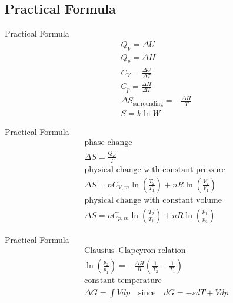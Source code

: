 \documentclass[12pt,compress]{beamer}
\begin{document}
\subsection{Practical Formula}
\begin{frame}{Practical Formula}
    \begin{align}
         & Q_V = \Delta U                                      \\
         & Q_p = \Delta H                                      \\
         & C_V = \frac{\Delta U}{\Delta T}                     \\
         & C_p = \frac{\Delta H}{\Delta T}                     \\
         & \Delta S_{\text{surrounding}} = -\frac{\Delta H}{T} \\
         & S=k\ln W
    \end{align}
\end{frame}
\begin{frame}{Practical Formula}
    \begin{align}
         & \text{phase change } \nonumber                                                         \\
         & \Delta S = \frac{Q_R}{T}                                                               \\
         & \text{physical change with constant pressure } \nonumber                               \\
         & \Delta S = nC_{V,m}\ln\left(\frac{T_2}{T_1}\right) + nR\ln\left(\frac{V_2}{V_1}\right) \\
         & \text{physical change with constant volume } \nonumber                                 \\
         & \Delta S = nC_{p,m}\ln\left(\frac{T_2}{T_1}\right) + nR\ln\left(\frac{p_1}{p_2}\right)
    \end{align}
\end{frame}
\begin{frame}{Practical Formula}
    \begin{align}
         & \text{Clausius–Clapeyron relation} \nonumber                                                  \\
         & \ln\left(\frac{p_2}{p_1}\right) = -\frac{\Delta H}{R}\left(\frac{1}{T_2}-\frac{1}{T_1}\right) \\
         & \text{constant temperature} \nonumber                                                         \\
         & \Delta G = \int V dp \quad \text{since}\quad dG = -sdT + Vdp
    \end{align}
\end{frame}
\end{document}
